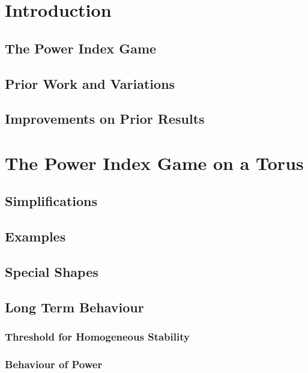 \documentclass[12pt]{article}
\theoremstyle{definition}
\theoremstyle{remark}
\theoremstyle{remark}
\begin{document}

\tableofcontents

\section{Introduction} \label{IntroSec}

\subsection{The Power Index Game} \label{PIgame}

\subsection{Prior Work and Variations} \label{PriorWork}

\subsection{Improvements on Prior Results} \label{Improvements}

\section{The Power Index Game on a Torus} \label{Main Chapter}

\subsection{Simplifications}

\subsection{Examples}

\subsection{Special Shapes}

\subsection{Long Term Behaviour}

\subsubsection{Threshold for Homogeneous Stability}

\subsubsection{Behaviour of Power}
\end{document}
